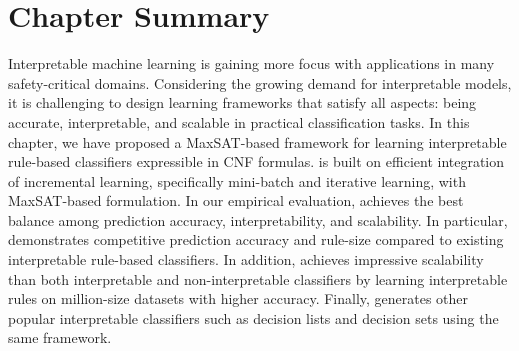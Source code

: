 
\section{Chapter Summary}
\label{interpretability_imli_sec:conclusion}
Interpretable machine learning is gaining more focus with applications in many safety-critical domains. Considering the growing demand for interpretable models, it is challenging to design learning frameworks that satisfy all aspects: being accurate, interpretable, and scalable in practical classification tasks.  In this chapter, we have proposed a MaxSAT-based framework {\imli} for learning interpretable rule-based classifiers expressible in CNF formulas. {\imli} is built on efficient integration of incremental learning, specifically mini-batch and iterative learning, with MaxSAT-based formulation.  In our empirical evaluation, {\imli} achieves the best balance among prediction accuracy, interpretability, and scalability. In particular, {\imli} demonstrates competitive prediction accuracy and rule-size compared to existing interpretable rule-based classifiers. In addition, {\imli} achieves impressive scalability than both interpretable and non-interpretable classifiers by learning interpretable rules on million-size datasets with higher accuracy.  Finally, {\imli}  generates other popular interpretable classifiers such as decision lists and decision sets using the same framework. 


